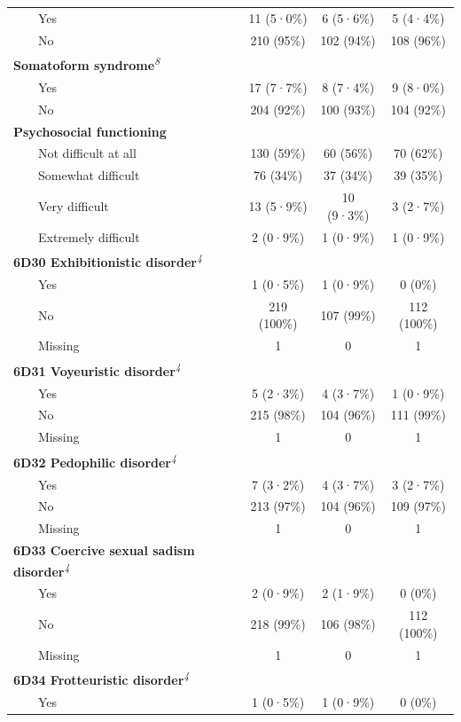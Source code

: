 \documentclass[
  super,
  preprint,
  1p,
  onecolumn]{elsarticle}
\begin{document}
\begin{table}
{\begin{tabular*}{\linewidth}{@{\extracolsep{\fill}}lccc}
    Yes & 11 (5·0\%) & 6 (5·6\%) & 5 (4·4\%) \\ 
    No & 210 (95\%) & 102 (94\%) & 108 (96\%) \\ 
{\bfseries Somatoform syndrome}\textsuperscript{\textit{8}} &  &  &  \\ 
    Yes & 17 (7·7\%) & 8 (7·4\%) & 9 (8·0\%) \\ 
    No & 204 (92\%) & 100 (93\%) & 104 (92\%) \\ 
{\bfseries Psychosocial functioning} &  &  &  \\ 
    Not difficult at all & 130 (59\%) & 60 (56\%) & 70 (62\%) \\ 
    Somewhat difficult & 76 (34\%) & 37 (34\%) & 39 (35\%) \\ 
    Very difficult & 13 (5·9\%) & 10 (9·3\%) & 3 (2·7\%) \\ 
    Extremely difficult & 2 (0·9\%) & 1 (0·9\%) & 1 (0·9\%) \\ 
{\bfseries 6D30 Exhibitionistic disorder}\textsuperscript{\textit{4}} &  &  &  \\ 
    Yes & 1 (0·5\%) & 1 (0·9\%) & 0 (0\%) \\ 
    No & 219 (100\%) & 107 (99\%) & 112 (100\%) \\ 
    Missing & 1 & 0 & 1 \\ 
{\bfseries 6D31 Voyeuristic disorder}\textsuperscript{\textit{4}} &  &  &  \\ 
    Yes & 5 (2·3\%) & 4 (3·7\%) & 1 (0·9\%) \\ 
    No & 215 (98\%) & 104 (96\%) & 111 (99\%) \\ 
    Missing & 1 & 0 & 1 \\ 
{\bfseries 6D32 Pedophilic disorder}\textsuperscript{\textit{4}} &  &  &  \\ 
    Yes & 7 (3·2\%) & 4 (3·7\%) & 3 (2·7\%) \\ 
    No & 213 (97\%) & 104 (96\%) & 109 (97\%) \\ 
    Missing & 1 & 0 & 1 \\ 
{\bfseries 6D33 Coercive sexual sadism disorder}\textsuperscript{\textit{4}} &  &  &  \\ 
    Yes & 2 (0·9\%) & 2 (1·9\%) & 0 (0\%) \\ 
    No & 218 (99\%) & 106 (98\%) & 112 (100\%) \\ 
    Missing & 1 & 0 & 1 \\ 
{\bfseries 6D34 Frotteuristic disorder}\textsuperscript{\textit{4}} &  &  &  \\ 
    Yes & 1 (0·5\%) & 1 (0·9\%) & 0 (0\%) \\ 

\end{tabular*}}
\end{table}
\end{document}
